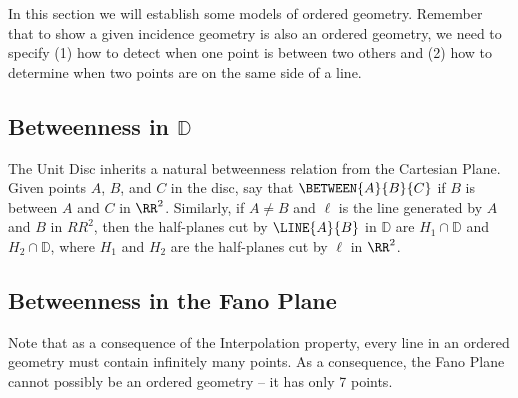 In this section we will establish some models of ordered geometry.
Remember that to show a given incidence geometry is also an ordered geometry, we need to specify (1) how to detect when one point is between two others and (2) how to determine when two points are on the same side of a line.

\subsection{Betweenness in \(\mathbb{D}\)}

The Unit Disc inherits a natural betweenness relation from the Cartesian Plane.
Given points \(A\), \(B\), and \(C\) in the disc, say that \(\BETWEEN{A}{B}{C}\) if \(B\) is between \(A\) and \(C\) in \(\RR^2\).
Similarly, if \(A \neq B\) and \(\ell\) is the line generated by \(A\) and \(B\) in \(RR^2\), then the half-planes cut by \(\LINE{A}{B}\) in \(\mathbb{D}\) are \(H_1 \cap \mathbb{D}\) and \(H_2 \cap \mathbb{D}\), where \(H_1\) and \(H_2\) are the half-planes cut by \(\ell\) in \(\RR^2\).


\subsection{Betweenness in the Fano Plane}

Note that as a consequence of the Interpolation property, every line in an ordered geometry must contain infinitely many points.
As a consequence, the Fano Plane cannot possibly be an ordered geometry -- it has only 7 points.
